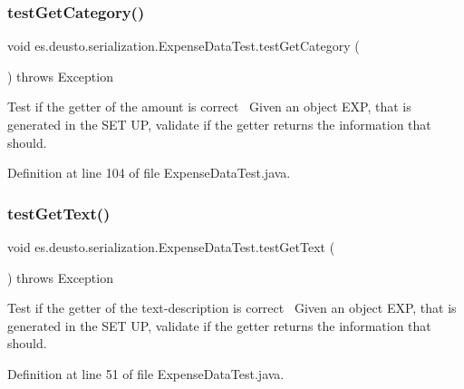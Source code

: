 \subsubsection{\texorpdfstring{test\+Get\+Category()}{testGetCategory()}}
{\footnotesize\ttfamily void es.\+deusto.\+serialization.\+Expense\+Data\+Test.\+test\+Get\+Category (\begin{DoxyParamCaption}{ }\end{DoxyParamCaption}) throws Exception}

Test if the getter of the amount is correct~\newline
Given an object E\+XP, that is generated in the S\+ET UP, validate if the getter returns the information that should.~\newline


Definition at line 104 of file Expense\+Data\+Test.\+java.

\mbox{\label{classes_1_1deusto_1_1serialization_1_1_expense_data_test_ae6098eb509929cfdf9e3848e9b9178a1}} 
\subsubsection{\texorpdfstring{test\+Get\+Text()}{testGetText()}}
{\footnotesize\ttfamily void es.\+deusto.\+serialization.\+Expense\+Data\+Test.\+test\+Get\+Text (\begin{DoxyParamCaption}{ }\end{DoxyParamCaption}) throws Exception}

Test if the getter of the text-\/description is correct~\newline
Given an object E\+XP, that is generated in the S\+ET UP, validate if the getter returns the information that should. 

Definition at line 51 of file Expense\+Data\+Test.\+java.

\mbox{\label{classes_1_1deusto_1_1serialization_1_1_expense_data_test_aa7fd4daec0dae9ed19ae737e666e4203}} 
